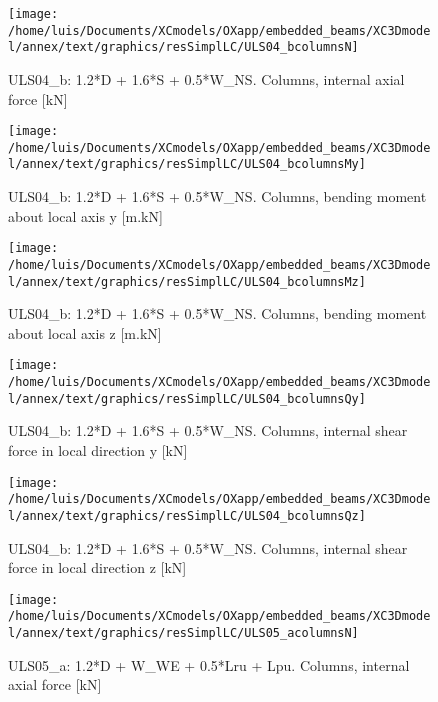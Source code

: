 \clearpage
\begin{figure}
\begin{center}
\texttt{[image: /home/luis/Documents/XCmodels/OXapp/embedded\_beams/XC3Dmodel/annex/text/graphics/resSimplLC/ULS04\_bcolumnsN]}
\caption{ULS04_b: 1.2*D + 1.6*S + 0.5*W_NS. Columns, internal axial force [kN]}
\end{center}
\end{figure}
\begin{figure}
\begin{center}
\texttt{[image: /home/luis/Documents/XCmodels/OXapp/embedded\_beams/XC3Dmodel/annex/text/graphics/resSimplLC/ULS04\_bcolumnsMy]}
\caption{ULS04_b: 1.2*D + 1.6*S + 0.5*W_NS. Columns, bending moment about local axis y [m.kN]}
\end{center}
\end{figure}
\begin{figure}
\begin{center}
\texttt{[image: /home/luis/Documents/XCmodels/OXapp/embedded\_beams/XC3Dmodel/annex/text/graphics/resSimplLC/ULS04\_bcolumnsMz]}
\caption{ULS04_b: 1.2*D + 1.6*S + 0.5*W_NS. Columns, bending moment about local axis z [m.kN]}
\end{center}
\end{figure}
\begin{figure}
\begin{center}
\texttt{[image: /home/luis/Documents/XCmodels/OXapp/embedded\_beams/XC3Dmodel/annex/text/graphics/resSimplLC/ULS04\_bcolumnsQy]}
\caption{ULS04_b: 1.2*D + 1.6*S + 0.5*W_NS. Columns, internal shear force in local direction y [kN]}
\end{center}
\end{figure}
\begin{figure}
\begin{center}
\texttt{[image: /home/luis/Documents/XCmodels/OXapp/embedded\_beams/XC3Dmodel/annex/text/graphics/resSimplLC/ULS04\_bcolumnsQz]}
\caption{ULS04_b: 1.2*D + 1.6*S + 0.5*W_NS. Columns, internal shear force in local direction z [kN]}
\end{center}
\end{figure}
\clearpage
\begin{figure}
\begin{center}
\texttt{[image: /home/luis/Documents/XCmodels/OXapp/embedded\_beams/XC3Dmodel/annex/text/graphics/resSimplLC/ULS05\_acolumnsN]}
\caption{ULS05_a: 1.2*D + W_WE + 0.5*Lru + Lpu. Columns, internal axial force [kN]}
\end{center}
\end{figure}
